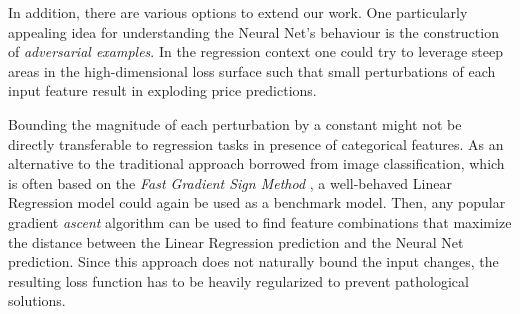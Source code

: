 In addition, there are various options to extend our work.
One particularly appealing idea for understanding the Neural Net's behaviour is the construction of \emph{adversarial examples}.
In the regression context one could try to leverage steep areas in the high-dimensional loss surface such that small perturbations of each input feature result in exploding price predictions.

Bounding the magnitude of each perturbation by a constant might not be directly transferable to regression tasks in presence of categorical features.
As an alternative to the traditional approach borrowed from image classification, which is often based on the \emph{Fast Gradient Sign Method} \citep{goodfellow2015}, a well-behaved Linear Regression model could again be used as a benchmark model.
Then, any popular gradient \emph{ascent} algorithm can be used to find feature combinations that maximize the distance between the Linear Regression prediction and the Neural Net prediction.
Since this approach does not naturally bound the input changes, the resulting loss function has to be heavily regularized to prevent pathological solutions.


